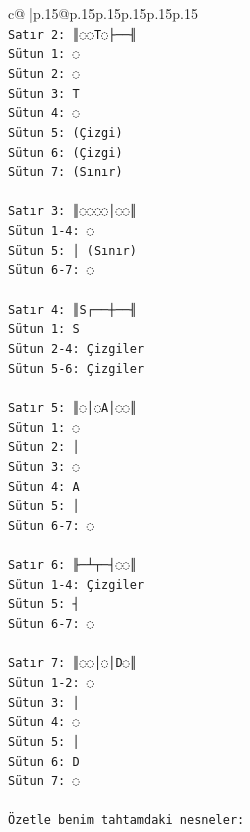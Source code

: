\documentclass{article}
\begin{document}
{\begin{supertabular}{c@{$\;$}|p{.15\linewidth}@{}p{.15\linewidth}p{.15\linewidth}p{.15\linewidth}p{.15\linewidth}p{.15\linewidth}}
{{{\\ 
\texttt{Satır 2: ║◌◌T◌├──╢} \\
\texttt{Sütun 1: ◌} \\
\texttt{Sütun 2: ◌} \\
\texttt{Sütun 3: T} \\
\texttt{Sütun 4: ◌} \\
\texttt{Sütun 5: (Çizgi)} \\
\texttt{Sütun 6: (Çizgi)} \\
\texttt{Sütun 7: (Sınır)} \\
\\ 
\texttt{Satır 3: ║◌◌◌◌│◌◌║} \\
\texttt{Sütun 1{-}4: ◌} \\
\texttt{Sütun 5: │ (Sınır)} \\
\texttt{Sütun 6{-}7: ◌} \\
\\ 
\texttt{Satır 4: ║S┌──┼──╢} \\
\texttt{Sütun 1: S} \\
\texttt{Sütun 2{-}4: Çizgiler} \\
\texttt{Sütun 5{-}6: Çizgiler} \\
\\ 
\texttt{Satır 5: ║◌│◌A│◌◌║} \\
\texttt{Sütun 1: ◌} \\
\texttt{Sütun 2: │} \\
\texttt{Sütun 3: ◌} \\
\texttt{Sütun 4: A} \\
\texttt{Sütun 5: │} \\
\texttt{Sütun 6{-}7: ◌} \\
\\ 
\texttt{Satır 6: ╟─┴┬─┤◌◌║} \\
\texttt{Sütun 1{-}4: Çizgiler} \\
\texttt{Sütun 5: ┤} \\
\texttt{Sütun 6{-}7: ◌} \\
\\ 
\texttt{Satır 7: ║◌◌│◌│D◌║} \\
\texttt{Sütun 1{-}2: ◌} \\
\texttt{Sütun 3: │} \\
\texttt{Sütun 4: ◌} \\
\texttt{Sütun 5: │} \\
\texttt{Sütun 6: D} \\
\texttt{Sütun 7: ◌} \\
\\ 
\texttt{Özetle benim tahtamdaki nesneler:} \\
}}}
\end{supertabular}}
\end{document}
